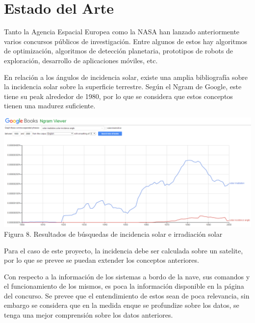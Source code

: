 \documentclass[../Main.tex]{subfiles}
\begin{document}
\section{Estado del Arte}
Tanto la Agencia Espacial Europea como la NASA han lanzado anteriormente varios concursos públicos de investigación. Entre algunos de estos hay algoritmos de optimización, algoritmos de detección planetaria, prototipos de robots de exploración, desarrollo de aplicaciones móviles, etc.
\newline \par
En relación a los ángulos de incidencia solar, existe una amplia bibliografía sobre la incidencia solar sobre la superficie terrestre. Según el Ngram de Google, este tiene su peak alrededor de 1980, por lo que se considera que estos conceptos tienen una madurez suficiente.
\begin{center}
\includegraphics[width=\linewidth, trim={0 0 0 45mm}, clip]{Assets/IncidenciaSolar.PNG}
\\Figura 8. Resultados de búsquedas de incidencia solar e irradiación solar
\end{center}
Para el caso de este proyecto, la incidencia debe ser calculada sobre un satelite, por lo que se prevee se puedan extender los conceptos anteriores.
\newline \par
Con respecto a la información de los sistemas a bordo de la nave, sus comandos y el funcionamiento de los mismos, es poca la información disponible en la página del concurso. Se prevee que el entendimiento de estos sean de poca relevancia, sin embargo se considera que en la medida enque se profundize sobre los datos, se tenga una mejor comprensión sobre los datos anteriores. 
\end{document}
